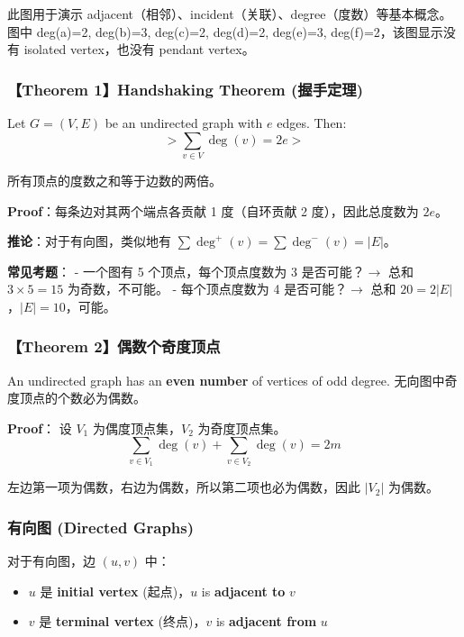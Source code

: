 \documentclass[10pt,a4paper,openany]{ctexbook}
\theoremstyle{definition}
\theoremstyle{remark}
\renewenvironment{quote}
  {\list{}{\leftmargin=1em\rightmargin=0pt\topsep=0.5pt\partopsep=0pt}\item[]}
  {\endlist}
\begin{document}
此图用于演示 adjacent（相邻）、incident（关联）、degree（度数）等基本概念。图中 deg(a)=2, deg(b)=3, deg(c)=2, deg(d)=2, deg(e)=3, deg(f)=2，该图显示没有 isolated vertex，也没有 pendant vertex。
\vspace{-2pt}

\subsubsection{【Theorem 1】Handshaking Theorem (握手定理)}

\begin{quote}
Let $G = (V, E)$ be an undirected graph with $e$ edges. Then:
\[
> \sum_{v \in V} \deg(v) = 2e
> 
\]

所有顶点的度数之和等于边数的两倍。

\textbf{Proof}：每条边对其两个端点各贡献 1 度（自环贡献 2 度），因此总度数为 $2e$。

\textbf{推论}：对于有向图，类似地有 $\sum \deg^+(v) = \sum \deg^-(v) = |E|$。

\textbf{常见考题}：
- 一个图有 5 个顶点，每个顶点度数为 3 是否可能？$\rightarrow$ 总和 $3\times5=15$ 为奇数，不可能。
- 每个顶点度数为 4 是否可能？$\rightarrow$ 总和 $20=2|E|$，$|E|=10$，可能。

\end{quote}
\vspace{-2pt}

\subsubsection{【Theorem 2】偶数个奇度顶点}

\begin{quote}
An undirected graph has an \textbf{even number} of vertices of odd degree.
无向图中奇度顶点的个数必为偶数。

\textbf{Proof}：
设 $V_1$ 为偶度顶点集，$V_2$ 为奇度顶点集。
\[
\sum_{v \in V_1} \deg(v) + \sum_{v \in V_2} \deg(v) = 2m
\]

左边第一项为偶数，右边为偶数，所以第二项也必为偶数，因此 $|V_2|$ 为偶数。

\end{quote}
\vspace{-2pt}

\subsubsection{有向图 (Directed Graphs)}

对于有向图，边 $(u, v)$ 中：
\begin{itemize}
\item $u$ 是 \textbf{initial vertex} (起点)，$u$ is \textbf{adjacent to} $v$
\item $v$ 是 \textbf{terminal vertex} (终点)，$v$ is \textbf{adjacent from} $u$

\end{itemize}
\end{document}
